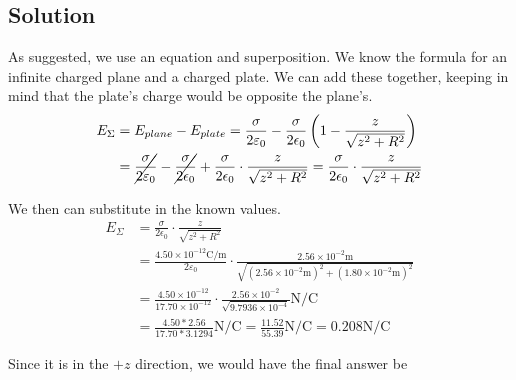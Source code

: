 \documentclass[12pt]{article}
\begin{document}
\subsection*{Solution}
As suggested, we use an equation and superposition. We know the formula for an infinite charged plane and a charged plate. We can add these together, keeping in mind that the plate's charge would be opposite the plane's.
\begin{align*}
    E_\Sigma    &=  E_{plane} - E_{plate}
        =   \frac{\sigma}{2\varepsilon_0} - \frac{\sigma}{2\epsilon_0} \left(1 - \frac{z}{\sqrt{z^2 + R^2}}\right)\\
        &=  \cancel{\frac{\sigma}{2\varepsilon_0}} - \cancel{\frac{\sigma}{2\epsilon_0}} + \frac{\sigma}{2\epsilon_0}\cdot\frac{z}{\sqrt{z^2 + R^2}}
        = \frac{\sigma}{2\epsilon_0}\cdot\frac{z}{\sqrt{z^2 + R^2}}
\end{align*}

We then can substitute in the known values.
\begin{align*}
    E_\Sigma    &=  \frac{\sigma}{2\epsilon_0}\cdot\frac{z}{\sqrt{z^2 + R^2}}\\
        &=  \frac{4.50 \times 10^{-12} \unit{\coulomb/\meter}}{2\varepsilon_0} \cdot \frac{2.56 \times 10^{-2} \unit{\meter}}{\sqrt{\left(2.56 \times 10^{-2} \unit{\meter}\right)^2 + \left(1.80 \times 10^{-2} \unit{\meter}\right)^2}}\\
        &=  \frac{4.50 \times 10^{-12}}{17.70 \times 10^{-12}} \cdot \frac{2.56 \times 10^{-2}}{\sqrt{9.7936 \times 10^{-4}}} \unit{\newton/\coulomb}\\
        &=  \frac{4.50*2.56}{17.70*3.1294} \unit{\newton/\coulomb}
        =   \frac{11.52}{55.39} \unit{\newton/\coulomb}
        =   0.208 \unit{\newton/\coulomb}
\end{align*}

Since it is in the $+z$ direction, we would have the final answer be 
\end{document}
